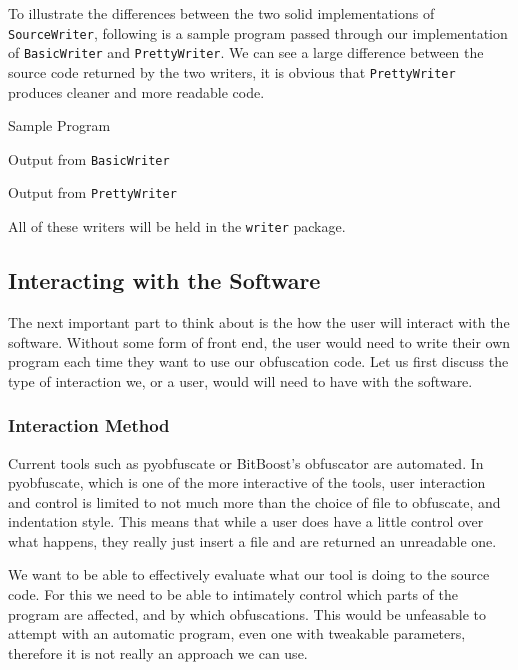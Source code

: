\documentclass[twoside,a4paper]{report}
\begin{document}
To illustrate the differences between the two solid implementations of \texttt{SourceWriter}, following is a sample program passed through our implementation of
\texttt{BasicWriter} and \texttt{PrettyWriter}. We can see a large difference between the source code returned by the two writers, it is obvious that
\texttt{PrettyWriter} produces cleaner and more readable code.

Sample Program



Output from \texttt{BasicWriter}



Output from \texttt{PrettyWriter}



All of these writers will be held in the \texttt{writer} package.

\subsection{Interacting with the Software}

The next important part to think about is the how the user will interact with the software. Without some form of front end, the
user would need to write their own program each time they want to use our obfuscation code. Let us first discuss the type of
interaction we, or a user, would will need to have with the software.

\subsubsection{Interaction Method}

Current tools such as pyobfuscate or BitBoost's obfuscator are automated. In pyobfuscate, which is one of the more interactive
of the tools, user interaction and control is limited to not much more than the choice of file to obfuscate, and indentation style. This means
that while a user does have a little control over what happens, they really just insert a file and are returned an
unreadable one.

We want to be able to effectively evaluate what our tool is doing to the source code. For this we need to be able to intimately control
which parts of the program are affected, and by which obfuscations. This would be unfeasable to attempt with an automatic program,
even one with tweakable parameters, therefore it is not really an approach we can use.
\end{document}

